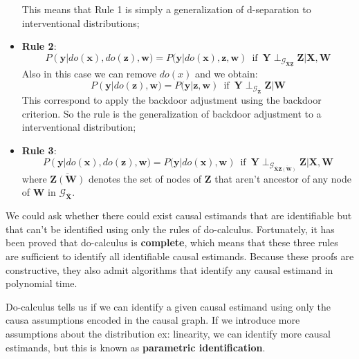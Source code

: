 \begin{definition}
\begin{itemize}
              This means that Rule 1 is simply a generalization of d-separation to
              interventional distributions;
        \item \textbf{Rule 2}:
              \begin{equation}
                  P(\mathbf{y} | do(\mathbf{x}), do(\mathbf{z}), \mathbf{w}) =
                  P(\mathbf{y} | do(\mathbf{x}), \mathbf{z}, \mathbf{w}) \,
                  \text{ if } \, \mathbf{Y} \perp_{\mathcal{G}_{\overline{\mathbf{X}}\underline{\mathbf{Z}}}} \mathbf{Z} | \mathbf{X}, \mathbf{W}
              \end{equation}
              Also in this case we can remove $do(x)$ and we obtain:
              \begin{equation*}
                  P(\mathbf{y} | do(\mathbf{z}), \mathbf{w}) = P(\mathbf{y} | \mathbf{z}, \mathbf{w}) \,
                  \text{ if } \, \mathbf{Y} \perp_{\mathcal{G}_{\overline{\mathbf{Z}}}} \mathbf{Z} | \mathbf{W}
              \end{equation*}
              This correspond to apply the backdoor adjustment using the backdoor
              criterion. So the rule is the generalization of backdoor adjustment to
              a interventional distribution;
        \item \textbf{Rule 3}:
              \begin{equation}
                  P(\mathbf{y} | do(\mathbf{x}), do(\mathbf{z}), \mathbf{w}) =
                  P(\mathbf{y} | do(\mathbf{x}), \mathbf{w}) \, \text{ if } \,
                  \mathbf{Y} \perp_{\mathcal{G}_{\overline{\mathbf{X}}\overline{\mathbf{Z}(\mathbf{W})}}} \mathbf{Z} | \mathbf{X}, \mathbf{W}
              \end{equation}
              where $\overline{\mathbf{Z}(\mathbf{W})}$ denotes the set of nodes
              of $\mathbf{Z}$ that aren't ancestor of any node of $\mathbf{W}$
              in $\mathcal{G}_{\overline{\mathbf{X}}}$.
    \end{itemize}
\end{definition}
We could ask whether there could exist causal estimands that are identifiable but
that can't be identified using only the rules of do-calculus. Fortunately, it
has been proved that do-calculus is \textbf{complete}, which means that these
three rules are sufficient to identify all identifiable causal estimands. Because
these proofs are constructive, they also admit algorithms that identify any causal
estimand in polynomial time.

Do-calculus tells us if we can identify a given causal estimand using only the
causa assumptions encoded in the causal graph. If we introduce more assumptions
about the distribution ex: linearity, we can identify more causal estimands, but
this is known as \textbf{parametric identification}.

